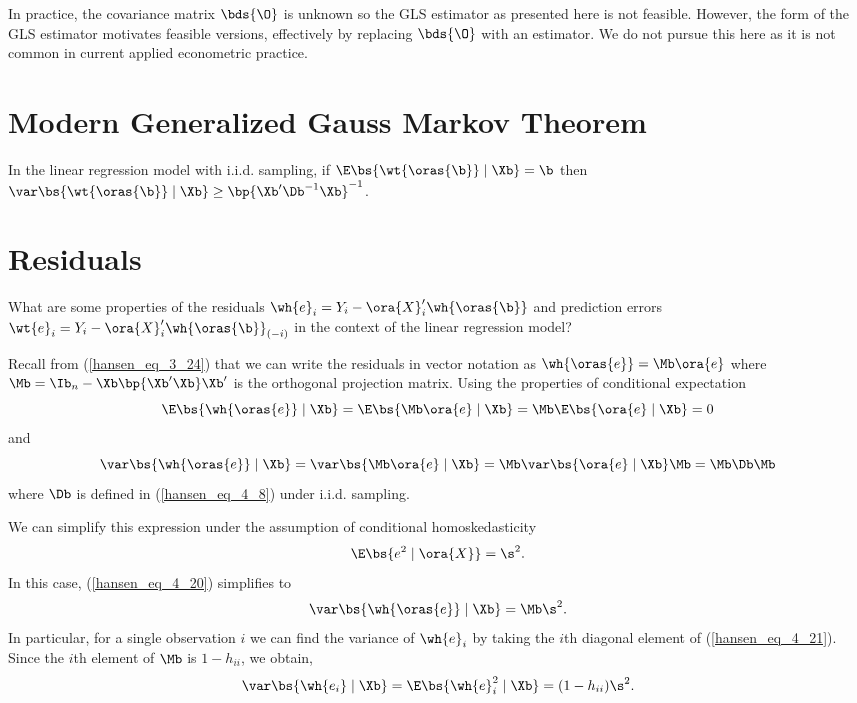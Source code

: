 In practice, the covariance matrix $\bds{\O}$ is unknown so the GLS estimator as presented here is not feasible. However, the form of the GLS estimator motivates feasible versions, effectively by replacing $\bds{\O}$ with an estimator. We do not pursue this here as it is not common in current applied econometric practice.

\section{Modern Generalized Gauss Markov Theorem}

\begin{theorem}
    \label{hansen_thm_4_7}

    In the linear regression model with i.i.d. sampling, if $\E\bs{\wt{\oras{\b}} \mid \Xb} = \b$ then $\var\bs{\wt{\oras{\b}} \mid \Xb} \geq \bp{\Xb^\prime \Db^{-1} \Xb}^{-1}$.
\end{theorem}

\section{Residuals}

What are some properties of the residuals $\wh{e}_i = Y_i - \ora{X}_i^\prime \wh{\oras{\b}}$ and prediction errors $\wt{e}_i = Y_i - \ora{X}_i^\prime \wh{\oras{\b}}_{(-i)}$ in the context of the linear regression model?

Recall from (\ref{hansen_eq_3_24}) that we can write the residuals in vector notation as $\wh{\oras{e}} = \Mb \ora{e}$ where $\Mb = \Ib_n - \Xb \bp{\Xb^\prime \Xb} \Xb^\prime$ is the orthogonal projection matrix. Using the properties of conditional expectation
\begin{equation}
    \notag
    \E\bs{\wh{\oras{e}} \mid \Xb} = \E\bs{\Mb \ora{e} \mid \Xb} = \Mb \E\bs{\ora{e} \mid \Xb} = 0
\end{equation}
and 
\begin{equation}
    \label{hansen_eq_4_20}
    \var\bs{\wh{\oras{e}} \mid \Xb} = \var\bs{\Mb \ora{e} \mid \Xb} = \Mb \var\bs{\ora{e} \mid \Xb} \Mb = \Mb \Db \Mb
\end{equation}
where $\Db$ is defined in (\ref{hansen_eq_4_8}) under i.i.d. sampling.

We can simplify this expression under the assumption of conditional homoskedasticity
\begin{equation}
    \notag
    \E\bs{e^2 \mid \ora{X}} = \s^2.
\end{equation}
In this case, (\ref{hansen_eq_4_20}) simplifies to 
\begin{equation}
    \label{hansen_eq_4_21}
    \var\bs{\wh{\oras{e}} \mid \Xb} = \Mb \s^2.
\end{equation}
In particular, for a single observation $i$ we can find the variance of $\wh{e}_i$ by taking the $i$th diagonal element of (\ref{hansen_eq_4_21}). Since the $i$th element of $\Mb$ is $1 - h_{ii}$, we obtain,
\begin{equation}
    \label{hansen_eq_4_22}
    \var\bs{\wh{e_i} \mid \Xb} = \E\bs{\wh{e}_i^2 \mid \Xb} = (1 - h_{ii}) \s^2.
\end{equation}

